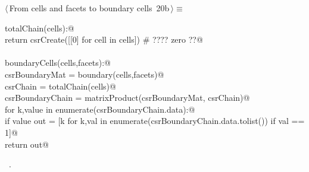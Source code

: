 \documentclass[11pt,oneside]{article}	%
\begin{document}
\begin{flushleft} \small \label{scrap36}
\protect{}$\langle\,$From cells and facets to boundary cells\nobreak\ {\footnotesize 20b}$\,\rangle\equiv$
\vspace{-1ex}
\begin{list}{}{} \item
\mbox{}\verb@def totalChain(cells):@\\
\mbox{}\verb@   return csrCreate([[0] for cell in cells])  # ????  zero ??@\\
\mbox{}\verb@@\\
\mbox{}\verb@def boundaryCells(cells,facets):@\\
\mbox{}\verb@   csrBoundaryMat = boundary(cells,facets)@\\
\mbox{}\verb@   csrChain = totalChain(cells)@\\
\mbox{}\verb@   csrBoundaryChain = matrixProduct(csrBoundaryMat, csrChain)@\\
\mbox{}\verb@   for k,value in enumerate(csrBoundaryChain.data):@\\
\mbox{}\verb@      if value % 2 == 0: csrBoundaryChain.data[k] = 0@\\
\mbox{}\verb@   out = [k for k,val in enumerate(csrBoundaryChain.data.tolist()) if val == 1]@\\
\mbox{}\verb@   return out@\\
\mbox{}\verb@@{\NWsep}
\end{list}
\vspace{-1ex}
\footnotesize\addtolength{\baselineskip}{-1ex}
\begin{list}{}{\setlength{\itemsep}{-\parsep}\setlength{\itemindent}{-\leftmargin}}
\item \NWtxtMacroRefIn\ .
\end{list}
\end{flushleft}
\end{document}
